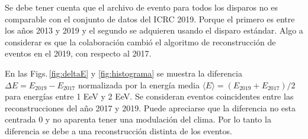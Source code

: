     Se debe tener cuenta que el archivo de evento para todos los disparos no es comparable con el conjunto  de datos del ICRC 2019. Porque el primero es entre los años 2013 y 2019 y el segundo se adquieren usando el disparo estándar.  Algo a considerar es que la colaboración cambió el algoritmo de reconstrucción de eventos en el 2019, con respecto al 2017.  

    En las  Figs.\,\ref{fig:deltaE} y \ref{fig:histograma} se muestra la diferencia $\Delta E = E_{2019} - E_{2017}$ normalizada por la energía media $\langle E \rangle= (E_{2019} +  E_{2017})/2 $ para energías entre 1 EeV y 2 EeV. Se consideran eventos coincidentes entre las reconstrucciones del año 2017 y 2019. Puede apreciarse que la diferencia no esta centrada 0 y no aparenta tener una modulación del clima. Por lo tanto la diferencia se debe a una reconstrucción distinta de los eventos. 

